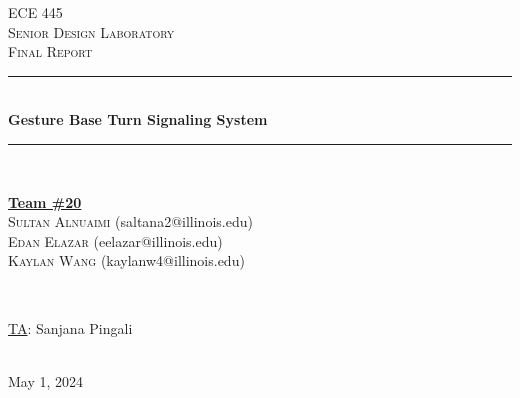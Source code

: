 \documentclass[12pt]{article}
\begin{document}
\begin{titlepage}
\newcommand{\HRule}{\rule{\linewidth}{0.1mm}} 
\center %
 
\textsc{\Large ECE 445}\\[0.5cm] %
\textsc{\large Senior Design Laboratory}\\[0.5cm] %
\textsc{\Large Final Report }\\[0.5cm] %

\HRule \\[0.5cm]
\huge \textbf{Gesture Base Turn Signaling System} %
\HRule \\[2cm]
 
\begin{minipage}{0.5\textwidth}
    \begin{center} \large
        \underline{\textbf{Team \#20}} \\ \medskip
        \textsc{Sultan Alnuaimi} (saltana2@illinois.edu) \\
        \textsc{Edan Elazar} (eelazar@illinois.edu) \\  
        \textsc{Kaylan Wang} (kaylanw4@illinois.edu)    
    \end{center}
\end{minipage} \\[1.5cm]

\begin{minipage}{0.5\textwidth}
    \begin{center}
        \large
        \underline{TA}: Sanjana Pingali
    \end{center}
\end{minipage} \\[1cm]

{\large May 1, 2024} %

\vfill %

\end{titlepage}
\setcounter{page}{2}
\clearpage
\tableofcontents
\newpage
\end{document}
